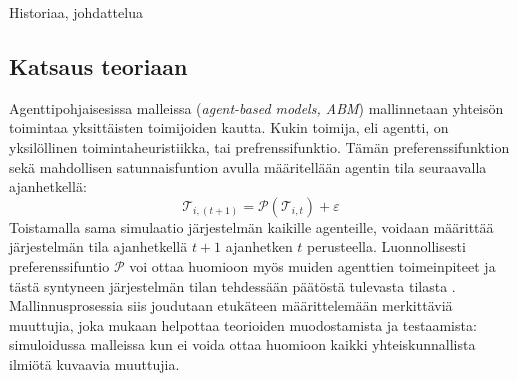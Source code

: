 \documentclass[finnish,gradu,twoside,12pt]{tktltiki}
\begin{document}
Historiaa, johdattelua

\subsection{Katsaus teoriaan}

Agenttipohjaisesissa malleissa (\textit{agent-based models, ABM}) mallinnetaan yhteisön toimintaa yksittäisten toimijoiden kautta. Kukin toimija, eli agentti, on yksilöllinen toimintaheuristiikka, tai prefrenssifunktio. Tämän preferenssifunktion sekä mahdollisen satunnaisfuntion avulla määritellään agentin tila seuraavalla ajanhetkellä: \begin{equation}\mathcal{T}_{i,(t+1)} = \mathcal{P}( \mathcal{T}_{i,t} ) + \varepsilon \label{abm:yhtälö}\end{equation} Toistamalla sama simulaatio järjestelmän kaikille agenteille, voidaan määrittää järjestelmän tila ajanhetkellä $t+1$ ajanhetken $t$ perusteella. Luonnollisesti preferenssifuntio $\mathcal{P}$ voi ottaa huomioon myös muiden agenttien toimeinpiteet ja tästä syntyneen järjestelmän tilan tehdessään päätöstä tulevasta tilasta \citep[esimerkiksi][]{Bonabeau2002}.  Mallinnusprosessia siis joudutaan etukäteen määrittelemään merkittäviä muuttujia, joka \citet{Gilbert1993} mukaan helpottaa teorioiden muodostamista ja testaamista: simuloidussa malleissa kun ei voida ottaa huomioon kaikki yhteiskunnallista ilmiötä kuvaavia muuttujia.
\end{document}
